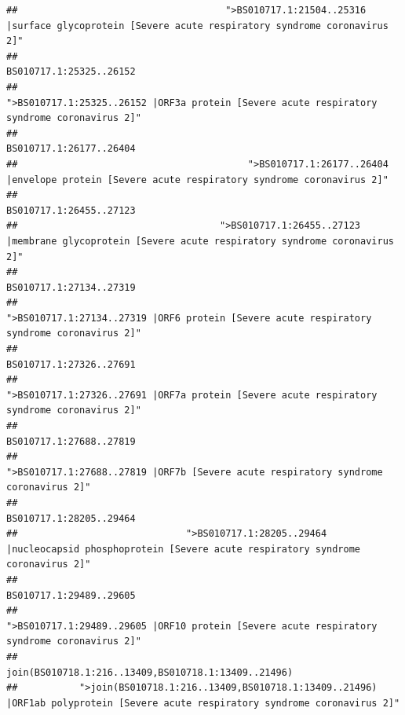 \documentclass[
]{article}
\begin{document}
\begin{verbatim}
##                                     ">BS010717.1:21504..25316 |surface glycoprotein [Severe acute respiratory syndrome coronavirus 2]" 
##                                                                                                                BS010717.1:25325..26152 
##                                            ">BS010717.1:25325..26152 |ORF3a protein [Severe acute respiratory syndrome coronavirus 2]" 
##                                                                                                                BS010717.1:26177..26404 
##                                         ">BS010717.1:26177..26404 |envelope protein [Severe acute respiratory syndrome coronavirus 2]" 
##                                                                                                                BS010717.1:26455..27123 
##                                    ">BS010717.1:26455..27123 |membrane glycoprotein [Severe acute respiratory syndrome coronavirus 2]" 
##                                                                                                                BS010717.1:27134..27319 
##                                             ">BS010717.1:27134..27319 |ORF6 protein [Severe acute respiratory syndrome coronavirus 2]" 
##                                                                                                                BS010717.1:27326..27691 
##                                            ">BS010717.1:27326..27691 |ORF7a protein [Severe acute respiratory syndrome coronavirus 2]" 
##                                                                                                                BS010717.1:27688..27819 
##                                                    ">BS010717.1:27688..27819 |ORF7b [Severe acute respiratory syndrome coronavirus 2]" 
##                                                                                                                BS010717.1:28205..29464 
##                              ">BS010717.1:28205..29464 |nucleocapsid phosphoprotein [Severe acute respiratory syndrome coronavirus 2]" 
##                                                                                                                BS010717.1:29489..29605 
##                                            ">BS010717.1:29489..29605 |ORF10 protein [Severe acute respiratory syndrome coronavirus 2]" 
##                                                                                    join(BS010718.1:216..13409,BS010718.1:13409..21496) 
##           ">join(BS010718.1:216..13409,BS010718.1:13409..21496) |ORF1ab polyprotein [Severe acute respiratory syndrome coronavirus 2]" 

\end{verbatim}
\end{document}

